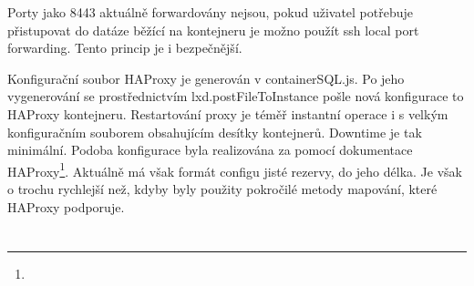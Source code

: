 \documentclass[a4paper,oneside,12pt]{report}
\let\openright=\clearpage
\begin{document}
Porty jako 8443 aktuálně forwardovány nejsou, pokud uživatel potřebuje přistupovat do datáze běžící na kontejneru je možno použít ssh local port forwarding.
Tento princip je i bezpečnější.

Konfigurační soubor HAProxy je generován v containerSQL.js.
Po jeho vygenerování se prostřednictvím lxd.postFileToInstance pošle nová konfigurace to HAProxy kontejneru.
Restartování proxy je téměř instantní operace i s velkým konfiguračním souborem obsahujícím desítky kontejnerů.
Downtime je tak minimální.
Podoba konfigurace byla realizována za pomocí dokumentace HAProxy\footnote{}.
Aktuálně má však formát configu jisté rezervy, do jeho délka.
Je však o trochu rychlejší než, kdyby byly použity pokročilé metody mapování, které HAProxy podporuje.




\chapter*{}
\setcounter{page}{6}




\listoffigures
\openright
\end{document}
